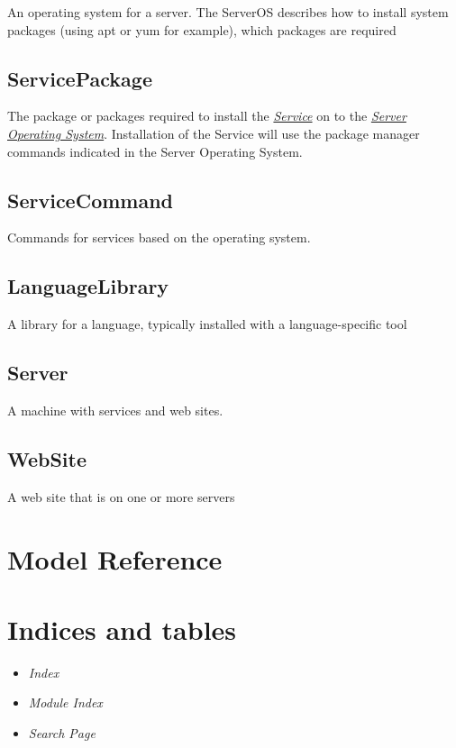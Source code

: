\documentclass[letterpaper,10pt,english]{manual}
\begin{document}
An operating system for a server. The ServerOS describes how to install system packages (using apt or yum for example), which packages are required
\hypertarget{models-servicepackage}{}

\section{ServicePackage}

The package or packages required to install the \hyperlink{models-service}{\emph{Service}} on to the \hyperlink{models-serveros}{\emph{Server Operating System}}. Installation of the Service will use the package manager commands indicated in the Server Operating System.
\hypertarget{models-servicecommand}{}

\section{ServiceCommand}

Commands for services based on the operating system.
\hypertarget{models-languagelibrary}{}

\section{LanguageLibrary}

A library for a language, typically installed with a language-specific tool
\hypertarget{models-server}{}

\section{Server}

A machine with services and web sites.
\hypertarget{models-website}{}

\section{WebSite}

A web site that is on one or more servers

\resetcurrentobjects
\hypertarget{--doc-reference/models}{}

\chapter{Model Reference}


\chapter{Indices and tables}
\begin{itemize}
\item {} 
\emph{Index}

\item {} 
\emph{Module Index}

\item {} 
\emph{Search Page}

\end{itemize}


\renewcommand{\indexname}{Module Index}
\printmodindex
\renewcommand{\indexname}{Index}
\printindex
\end{document}
